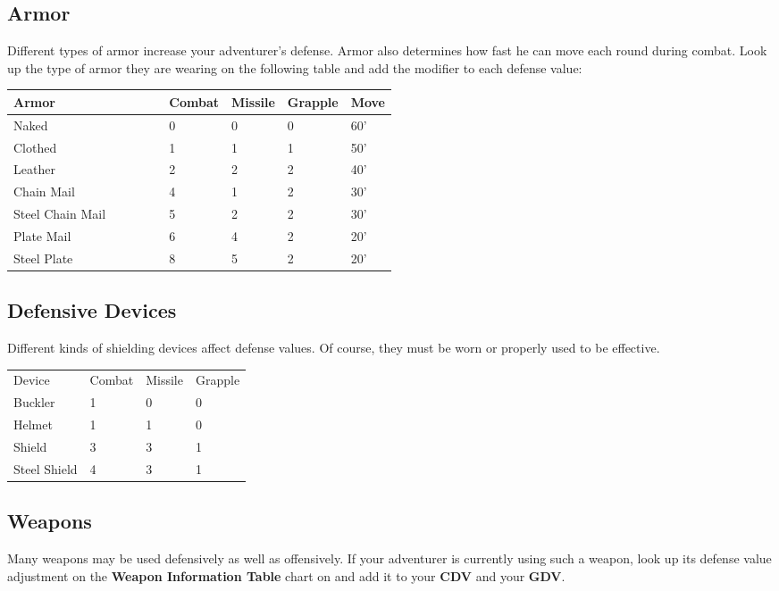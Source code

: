 \begin{multicols*}{2}
\subsection{Armor}
Different types of armor increase your adventurer's defense. Armor also determines how fast he can move each round during combat. Look up the type of armor they are wearing on the following table and add the modifier to each defense value:
\begin{normbox}
\begin{tabular}{@{}l p{0.125\linewidth} p{0.125\linewidth} p{0.125\linewidth} p{0.125\linewidth}}
\small
\textbf{Armor} & \textbf{Combat} & \textbf{Missile} & \textbf{Grapple} & \textbf{Move}\\
\midrule
Naked & 0 & 0 & 0 & 60'\\
Clothed & 1 & 1 & 1 & 50'\\
Leather & 2 & 2 & 2 & 40'\\
Chain Mail & 4 & 1 & 2 & 30'\\
Steel Chain Mail  & 5 & 2 & 2 & 30'\\
Plate Mail & 6 & 4 & 2 & 20'\\
Steel Plate & 8 & 5 & 2 & 20'\\
\end{tabular}
\end{normbox}
\subsection{Defensive Devices}
Different kinds of shielding devices affect defense values. Of course, they must be worn or properly used to be effective.
\begin{normbox}
\begin{tabular}{l l l l}
Device & Combat & Missile & Grapple\\
Buckler & 1 & 0 & 0\\
Helmet & 1 & 1 & 0\\
Shield & 3 & 3 & 1\\
Steel Shield & 4 & 3 & 1\\
\end{tabular}
\end{normbox}
\subsection{Weapons}
Many weapons may be used defensively as well as offensively. If your adventurer is currently using such a weapon, look up its defense value adjustment on the \textbf{Weapon Information Table} chart on \tcpage{\pageref{playing-weapon-table}} and add it to your \textbf{CDV} and your \textbf{GDV}.
\end{multicols*}